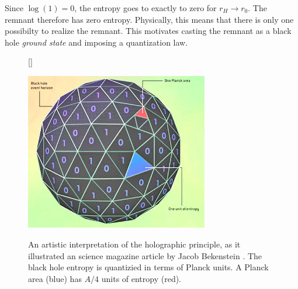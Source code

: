 \documentclass[12pt,a4paper]{report}
\numberwithin{equation}{chapter}
\begin{document}
Since $\log(1)=0$, the entropy goes to exactly to zero for $r_H \to r_0$. The remnant therefore has zero entropy. Physically, this means that there is only one possibilty to realize the remnant. This motivates casting the remnant as a black hole \emph{ground state} and imposing a quantization law.


\begin{figure}[b!]
[\FBwidth]{%
\caption[Artistic illustration of the holographic principle, taken from \cite{kamajian}]{An artistic interpretation of the holographic principle, as it illustrated an science magazine article by Jacob Bekenstein \cite{kamajian}. The black hole entropy is quantizied in terms of Planck units. A Planck area (blue) has $A/4$ units of entropy (red).
}\label{fig:bitsbytes}
}{\includegraphics[width=8cm]{figures/holouniverse03_01.jpg}}
\end{figure}
\end{document}
